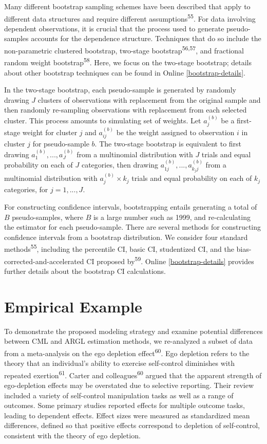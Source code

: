\documentclass[
  american,
  man, donotrepeattitle,floatsintext]{apa7}
\begin{document}
Many different bootstrap sampling schemes have been described that apply to different data structures and require different assumptions\textsuperscript{55}.
For data involving dependent observations, it is crucial that the process used to generate pseudo-samples accounts for the dependence structure.
Techniques that do so include the non-parametric clustered bootstrap, two-stage bootstrap\textsuperscript{56,57}, and fractional random weight bootstrap\textsuperscript{58}.
Here, we focus on the two-stage bootstrap; details about other bootstrap techniques can be found in Online \ref{bootstrap-details}.

In the two-stage bootstrap, each pseudo-sample is generated by randomly drawing \(J\) clusters of observations with replacement from the original sample and then randomly re-sampling observations with replacement from each selected cluster.
This process amounts to simulating set of weights. Let \(a_j^{(b)}\) be a first-stage weight for cluster \(j\) and \(a_{ij}^{(b)}\) be the weight assigned to observation \(i\) in cluster \(j\) for pseudo-sample \(b\).
The two-stage bootstrap is equivalent to first drawing \(a_1^{(b)},...,a_J^{(b)}\) from a multinomial distribution with \(J\) trials and equal probability on each of \(J\) categories, then drawing \(a_{1j}^{(b)},...,a_{k_j j}^{(b)}\) from a multinomial distribution with \(a_j^{(b)} \times k_j\) trials and equal probability on each of \(k_j\) categories, for \(j = 1,...,J\).

For constructing confidence intervals, bootstrapping entails generating a total of \(B\) pseudo-samples, where \(B\) is a large number such as 1999, and re-calculating the estimator for each pseudo-sample.
There are several methods for constructing confidence intervals from a bootstrap distribution.
We consider four standard methods\textsuperscript{55}, including the percentile CI, basic CI, studentized CI, and the bias-corrected-and-accelerated CI proposed by\textsuperscript{59}.
Online \ref{bootstrap-details} provides further details about the bootstrap CI calculations.

\section{Empirical Example}\label{empirical-example}

To demonstrate the proposed modeling strategy and examine potential differences between CML and ARGL estimation methods, we re-analyzed a subset of data from a meta-analysis on the ego depletion effect\textsuperscript{60}.
Ego depletion refers to the theory that an individual's ability to exercise self-control diminishes with repeated exertion\textsuperscript{61}.
Carter and colleagues\textsuperscript{60} argued that the apparent strength of ego-depletion effects may be overstated due to selective reporting.
Their review included a variety of self-control manipulation tasks as well as a range of outcomes.
Some primary studies reported effects for multiple outcome tasks, leading to dependent effects.
Effect sizes were measured as standardized mean differences, defined so that positive effects correspond to depletion of self-control, consistent with the theory of ego depletion.
\end{document}
